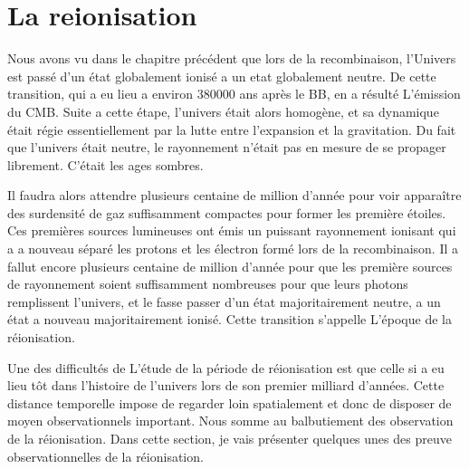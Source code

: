 \chapter{La reionisation} 
%
%
%
%


Nous avons vu dans le chapitre précédent que lors de la recombinaison, l'Univers est passé d'un état globalement ionisé a un etat globalement neutre.
De cette transition, qui a eu lieu a environ 380000 ans après le BB, en a résulté L’émission du CMB.
Suite a cette étape, l'univers était alors homogène, et sa dynamique était régie essentiellement par la lutte entre l'expansion et la gravitation.
Du fait que l'univers était neutre, le rayonnement n’était pas en mesure de se propager librement.
C’était les ages sombres.

Il faudra alors attendre plusieurs centaine de million d'année pour voir apparaître des surdensité de gaz suffisamment compactes pour former les première étoiles.
Ces premières sources lumineuses ont émis un puissant rayonnement ionisant qui a a nouveau séparé les protons et les électron formé lors de la recombinaison.
Il a fallut encore plusieurs centaine de million d'année pour que les première sources de rayonnement soient suffisamment nombreuses pour que leurs photons remplissent l'univers, et le fasse passer d'un état majoritairement neutre, a un état a nouveau majoritairement ionisé. 
Cette transition s’appelle L’époque de la réionisation.

Une des difficultés de L’étude de la période de réionisation est que celle si a eu lieu tôt dans l'histoire de l'univers lors de son premier milliard d'années.
Cette distance temporelle impose de regarder loin spatialement et donc de disposer de moyen observationnels important.
Nous somme au balbutiement des observation de la réionisation.
Dans cette section, je vais présenter quelques unes des preuve observationnelles de la réionisation. 

